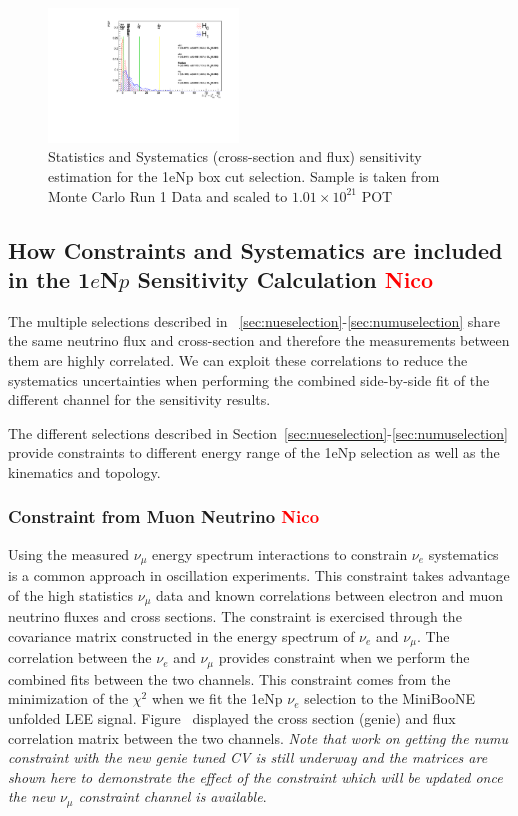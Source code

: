 \documentclass[a4paper]{article}
\begin{document}
\begin{figure}[H]
\begin{center}
\includegraphics[width=0.45\textwidth]{Sensitivity/SBNfit_Cls_nue_reco_e_genietune_run1_LEE_syst.pdf}
\caption{\label{fig:1eNp:box:statsystsensitivity} Statistics and Systematics (cross-section and flux) sensitivity estimation for the 1eNp box cut selection. Sample is taken from Monte Carlo Run 1 Data and scaled to $1.01\times10^21$ POT}
\end{center}
\end{figure}

\subsection{How Constraints and Systematics are included in the 1$e$N$p$ Sensitivity Calculation \textcolor{red}{Nico}}

The multiple selections described in  ~\ref{sec:nueselection}-\ref{sec:numuselection} share the same neutrino flux and cross-section and therefore the measurements between them are highly correlated. We can exploit these correlations to reduce the systematics uncertainties when performing the combined side-by-side fit of the different channel for the sensitivity results.

The different selections described in Section~\ref{sec:nueselection}-\ref{sec:numuselection} provide constraints to different energy range of the 1eNp selection as well as the kinematics and topology.

\subsubsection{Constraint from Muon Neutrino \textcolor{red}{Nico}}
Using the measured $\nu_{\mu}$ energy spectrum interactions to constrain $\nu_e$ systematics is a common approach in oscillation experiments. 
This constraint takes advantage of the high statistics $\nu_{\mu}$ data and known correlations between electron and muon neutrino fluxes and cross sections. 
The constraint is exercised through the covariance matrix constructed in the energy spectrum of $\nu_e$ and $\nu_{\mu}$. 
The correlation between the $\nu_e$ and $\nu_{\mu}$ provides constraint when we perform the combined fits between the two channels. This constraint comes from the minimization of the $\chi^2$ when we fit the 1eNp $\nu_e$ selection to the MiniBooNE unfolded LEE signal. Figure~\cite{fig:numuconstraint} displayed the cross section (genie) and flux correlation matrix between the two channels. \textit{Note that work on getting the numu constraint with the new genie tuned CV is still underway and the matrices are shown here to demonstrate the effect of the constraint which will be updated once the new $\nu_{\mu}$ constraint channel is available}.
\end{document}
